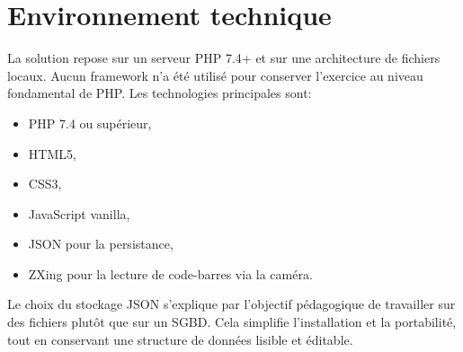 \documentclass[12pt,a4paper]{article}
\begin{document}
\section{Environnement technique}
La solution repose sur un serveur PHP 7.4+ et sur une architecture de fichiers locaux. Aucun framework n'a été utilisé pour conserver l'exercice au niveau fondamental de PHP. Les technologies principales sont:
\begin{itemize}
  \item PHP 7.4 ou supérieur,
  \item HTML5,
  \item CSS3,
  \item JavaScript vanilla,
  \item JSON pour la persistance,
  \item ZXing pour la lecture de code-barres via la caméra.
\end{itemize}

Le choix du stockage JSON s'explique par l'objectif pédagogique de travailler sur des fichiers plutôt que sur un SGBD. Cela simplifie l'installation et la portabilité, tout en conservant une structure de données lisible et éditable.
\end{document}
